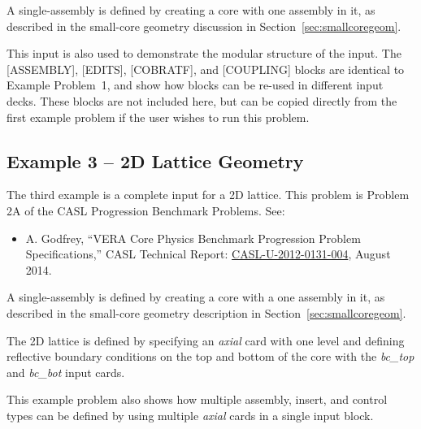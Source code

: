 \documentclass[11pt]{caslreport}
\begin{document}
A single-assembly is defined by creating a core with one assembly in it,
as described in the small-core geometry discussion in Section~\ref{sec:smallcoregeom}.

This input is also used to demonstrate the modular structure of the input.  The [ASSEMBLY],  [EDITS],
[COBRATF], and [COUPLING] blocks are identical to Example Problem~1, and show how blocks
can be re-used in different input decks.
These blocks are not included here, but can be copied directly from the first
example problem if the user wishes to run this problem.



\subsection{Example 3 -- 2D Lattice Geometry}
The third example is a complete input for a 2D lattice.
This problem is Problem 2A of the CASL Progression Benchmark Problems. See:
\begin{itemize}
\item A. Godfrey, ``VERA Core Physics Benchmark Progression Problem Specifications,''
CASL Technical Report: \href{http://www.casl.gov/docs/CASL-U-2012-0131-004.pdf}{CASL-U-2012-0131-004}, August 2014.
\end{itemize}


A single-assembly is defined by creating a core with a one assembly in it,
as described in the small-core geometry description in Section~\ref{sec:smallcoregeom}.

The 2D lattice is defined by specifying an {\it axial} card with one level and defining
reflective boundary conditions on the top and bottom of the core with the {\it bc\_top} and {\it bc\_bot}
input cards.

This example problem also shows how multiple assembly, insert, and control types can be
defined by using multiple {\it axial} cards in a single input block.




\end{document}
